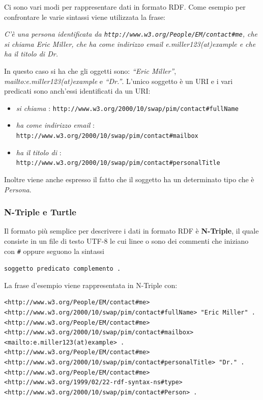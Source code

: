 Ci sono vari modi per rappresentare dati in formato RDF.
Come esempio per confrontare le varie sintassi viene utilizzata la frase:

\begin{center}
	\textit{C'è una persona identificata da \texttt{http://www.w3.org/People/EM/contact\#me}, che si chiama Eric Miller, che ha come indirizzo email e.miller123(at)example  e che ha il titolo di Dr.}
\end{center}

In questo caso si ha che gli oggetti sono: \textit{``Eric Miller''}, \textit{mailto:e.miller123(at)example} e \textit{``Dr.''}. L'unico soggetto è un URI e i vari predicati sono anch'essi identificati da un URI:

\begin{itemize}
	\item \textit{si chiama} : \texttt{http://www.w3.org/2000/10/swap/pim/contact\#fullName}
	\item \textit{ha come indirizzo email} : \texttt{http://www.w3.org/2000/10/swap/pim/contact\#mailbox}
	\item \textit{ha il titolo di} : \texttt{http://www.w3.org/2000/10/swap/pim/contact\#personalTitle}
\end{itemize}

Inoltre viene anche espresso il fatto che il soggetto ha un determinato tipo che è \textit{Persona}.

\subsubsection{N-Triple e Turtle}

Il formato più semplice per descrivere i dati in formato RDF è \textbf{N-Triple}, il quale consiste in un file di testo UTF-8 le cui linee o sono dei commenti che iniziano con \texttt{\#} oppure seguono la sintassi

\begin{center}
	\texttt{soggetto predicato complemento .}
\end{center}

La frase d'esempio viene rappresentata in N-Triple con:

\begin{lstlisting}
<http://www.w3.org/People/EM/contact#me> <http://www.w3.org/2000/10/swap/pim/contact#fullName> "Eric Miller" .
<http://www.w3.org/People/EM/contact#me> <http://www.w3.org/2000/10/swap/pim/contact#mailbox> <mailto:e.miller123(at)example> .
<http://www.w3.org/People/EM/contact#me> <http://www.w3.org/2000/10/swap/pim/contact#personalTitle> "Dr." .
<http://www.w3.org/People/EM/contact#me> <http://www.w3.org/1999/02/22-rdf-syntax-ns#type> <http://www.w3.org/2000/10/swap/pim/contact#Person> .
\end{lstlisting}

